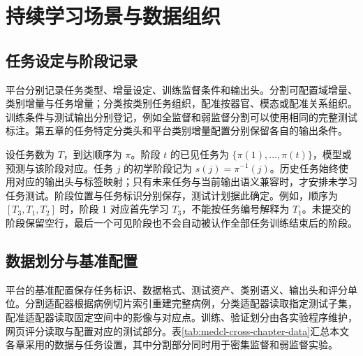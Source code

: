 \section{持续学习场景与数据组织}
\label{sec:medcl-scenario-modeling}

\subsection{任务设定与阶段记录}
\label{subsec:medcl-three-dimensions}
\label{subsec:medcl-task-setting-matrix}
\label{subsec:medcl-stage-config}
\label{sec:benchmark-scenarios}

平台分别记录任务类型、增量设定、训练监督条件和输出头。分割可配置域增量、类别增量与任务增量；分类按类别任务组织，配准按器官、模态或配准关系组织。训练条件与测试输出分别登记，例如全监督和弱监督分割可以使用相同的完整测试标注。第五章的任务特定分类头和平台类别增量配置分别保留各自的输出条件。

设任务数为 $T$，到达顺序为 $\pi$。阶段 $t$ 的已见任务为 $\{\pi(1),\ldots,\pi(t)\}$，模型或预测与该阶段对应。任务 $j$ 的初学阶段记为 $s(j)=\pi^{-1}(j)$。历史任务始终使用对应的输出头与标签映射；只有未来任务与当前输出语义兼容时，才安排未学习任务测试。阶段位置与任务标识分别保存，测试计划据此确定。例如，顺序为 $[T_3,T_1,T_2]$ 时，阶段 1 对应首先学习 $T_3$，不能按任务编号解释为 $T_1$。未提交的阶段保留空行，最后一个可见阶段也不会自动被认作全部任务训练结束后的阶段。

\subsection{数据划分与基准配置}
\label{sec:medcl-data-config}
\label{subsec:medcl-dataset-map}
\label{subsec:medcl-benchmark-config}

平台的基准配置保存任务标识、数据格式、测试资产、类别语义、输出头和评分单位。分割适配器根据病例切片索引重建完整病例，分类适配器读取指定测试子集，配准适配器读取固定空间中的影像与对应点。训练、验证划分由各实验程序维护，网页评分读取与配置对应的测试部分。表\ref{tab:medcl-cross-chapter-data}汇总本文各章采用的数据与任务设置，其中分割部分同时用于密集监督和弱监督实验。

